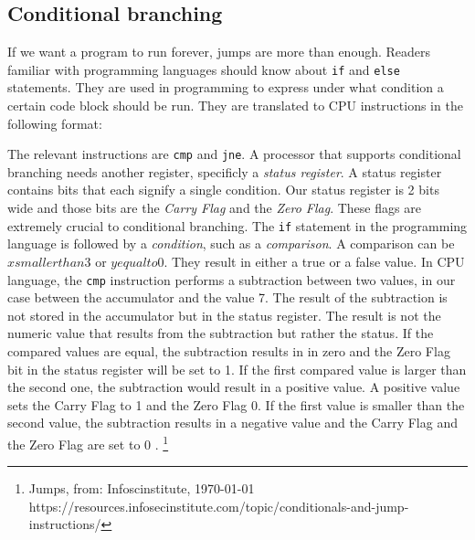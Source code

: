 \subsection{Conditional branching}

If we want a program to run forever, jumps are more than enough. Readers familiar with programming languages should know about \texttt{if} and \texttt{else} statements. They are used in programming to express
under what condition a certain code block should be run. They are translated to CPU instructions
in the following format:
\newline
\bigskip
\raggedright
The relevant instructions are \texttt{cmp} and \texttt{jne}. A processor that supports conditional branching needs
another register, specificly a \textit{status register}. A status register contains bits that each signify
a single condition. Our status register is 2 bits wide and those bits are the \textit{Carry Flag} and
the \textit{Zero Flag}. These flags are extremely crucial to conditional branching. The \texttt{if} statement
in the programming language is followed by a \textit{condition}, such as a \textit{comparison}. A comparison
can be $x smaller than 3$ or $y equal to 0$. They result in either a true or a false value. In 
CPU language, the \texttt{cmp} instruction performs a subtraction between two values, in our case between
the accumulator and the value 7. The result of the subtraction is not stored in the accumulator
but in the status register. The result is not the numeric value that results from the subtraction 
but rather the status. If the compared values are equal, the subtraction results in in zero and the
Zero Flag bit in the status register will be set to 1. If the first compared value is larger than the second one, the subtraction would result in a positive value. A positive value sets the
Carry Flag to 1 and the Zero Flag 0.
If the first value is smaller than the second value, the subtraction results in a negative value and
the Carry Flag and the Zero Flag are set to 0 . \footnote{Jumps, from: Infoscinstitute, \today \\ https://resources.infosecinstitute.com/topic/conditionals-and-jump-instructions/}


